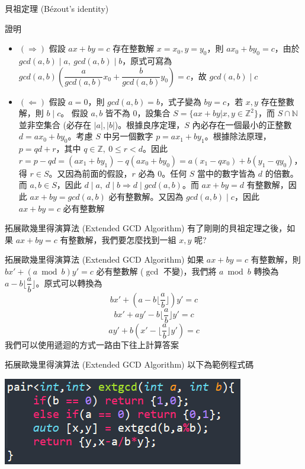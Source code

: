 \documentclass[aspectratio=169]{beamer}
\begin{document}
\begin{frame}{貝祖定理 (Bézout's identity)}
    \begin{block}{證明}
        \begin{itemize}
            \item $(\Rightarrow)$ 
            假設 $ax+by=c$ 存在整數解 $x=x_0, y=y_0$，則 $ax_0+by_0=c$，由於 $gcd(a,b) \mid a, \ gcd(a,b) \mid b$，原式可寫為 $gcd(a,b) (\dfrac{a}{gcd(a,b)}x_0 + \dfrac{b}{gcd(a,b)}y_0) = c$，故 $gcd(a,b) \mid c$
            \item $(\Leftarrow)$ 假設 $a=0$，則 $gcd(a,b)=b$，式子變為 $by = c$，若 $x,y$ 存在整數解，則 $b \mid c$。 
            \newline
            假設 $a,b$ 皆不為 $0$，設集合 $S = \{ax+by|x,y \in \mathbb{Z}^2\}$，而 $S \cap \mathbb{N}$ 並非空集合 (必存在 $|a|, |b|$)。根據良序定理，$S$ 內必存在一個最小的正整數 $d = ax_0+by_0$。考慮 $S$ 中另一個數字 $p=ax_1+by_1$。根據除法原理，$p = qd + r$，其中 $q \in \mathbb{Z}, \ 0 \le r < d$。因此 $r = p-qd = (ax_1+by_1)-q(ax_0+by_0) = a(x_1-qx_0)+b(y_1-qy_0)$，得 $r \in S$。又因為前面的假設，$r$ 必為 $0$。任何 $S$ 當中的數字皆為 $d$ 的倍數。而 $a,b \in S$，因此 $d \mid a, \ d \mid b \Rightarrow d \mid gcd(a,b)$。而 $ax+by=d$ 有整數解，因此 $ax+by=gcd(a,b)$ 必有整數解。又因為 $gcd(a,b) \mid c$，因此 $ax+by=c$ 必有整數解
        \end{itemize}
    \end{block}
\end{frame}

\begin{frame}{拓展歐幾里得演算法 (Extended GCD Algorithm)}
    有了剛剛的貝祖定理之後，如果 $ax+by=c$ 有整數解，我們要怎麼找到一組 $x,y$ 呢?
    \begin{alertblock}{拓展歐幾里得演算法 (Extended GCD Algorithm)}
        如果 $ax+by=c$ 有整數解，則 $bx'+(a \bmod b)y' = c$ 必有整數解 ($\gcd$ 不變)，我們將 $a \bmod b$ 轉換為 $a - b \Big \lfloor \dfrac{a}{b} \Big \rfloor$。原式可以轉換為 
        $$bx' + (a - b \Big \lfloor \dfrac{a}{b} \Big \rfloor)y' = c$$
        $$bx' + ay' - b \Big \lfloor \dfrac{a}{b} \Big \rfloor y' = c$$
        $$ay' + b (x' - \Big \lfloor \dfrac{a}{b} \Big \rfloor y') = c$$
        我們可以使用遞迴的方式一路由下往上計算答案
    \end{alertblock} 
\end{frame}

\begin{frame}{拓展歐幾里得演算法 (Extended GCD Algorithm)}
    以下為範例程式碼
    \begin{center}
        \includegraphics[]{images/code7.png}
    \end{center}
\end{frame}
\end{document}
